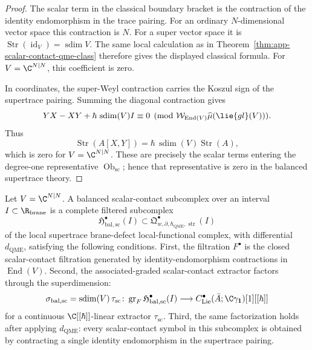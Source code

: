 \begin{proof}
  The scalar term in the classical boundary bracket is the contraction
  of the identity endomorphism in the trace pairing.  For an ordinary
  \(N\)-dimensional vector space this contraction is \(N\).  For a
  super vector space it is
  \(\operatorname{Str}(\operatorname{id}_V)=\operatorname{sdim}V\).
  The same local calculation as in
  Theorem~\ref{thm:app-scalar-contact-qme-class} therefore gives the
  displayed classical formula.  For \(V=\C^{N|N}\), this coefficient is
  zero.

  In coordinates, the super-Weyl contraction carries the Koszul sign of
  the supertrace pairing.  Summing the diagonal contraction gives
  \[
    YX-XY+\hbar\,\operatorname{sdim}(V)I\equiv0
      \pmod{\mathcal W_{\operatorname{End}(V)}
             \widehat\mu(\lie{gl}(V))}.
  \]
  Thus
  \[
    \operatorname{Str}(A[X,Y])
      =\hbar\,\operatorname{sdim}(V)\operatorname{Str}(A),
  \]
  which is zero for \(V=\C^{N|N}\).  These are precisely the scalar
  terms entering the degree-one representative
  \(\operatorname{Ob}_{\mathrm{sc}}\); hence that representative is
  zero in the balanced supertrace theory.
\end{proof}

\begin{defn}
\label{def:app-balanced-scalar-contact-subcomplex}
  Let \(V=\C^{N|N}\).  A balanced scalar-contact subcomplex over an interval
  \(I\subset\R_{\mathrm{brane}}\) is a complete filtered subcomplex
  \[
    \mathfrak H^\bullet_{\mathrm{bal,sc}}(I)
      \subset
    \mathfrak Q^\bullet_{w,\partial,\hbar_{\mathrm{QME}},\operatorname{str}}(I)
  \]
  of the local supertrace brane-defect local-functional complex, with
  differential \(d_{\mathrm{QME}}\), satisfying the following conditions.
  First, the filtration \(F^\bullet\) is the closed scalar-contact
  filtration generated by identity-endomorphism contractions in
  \(\operatorname{End}(V)\).  Second, the associated-graded scalar-contact
  extractor factors through the superdimension:
  \[
    \sigma_{\mathrm{bal,sc}}
      =
    \operatorname{sdim}(V)\,\tau_{\mathrm{sc}}
      \colon
    \operatorname{gr}_{F}\mathfrak H^\bullet_{\mathrm{bal,sc}}(I)
      \longrightarrow
    C^\bullet_{\mathrm{Lie}}(\bar A;\C\gamma_{\mathbf 1})[1][[\hbar]]
  \]
  for a continuous \(\C[[\hbar]]\)-linear extractor
  \(\tau_{\mathrm{sc}}\).  Third, the same factorization holds after
  applying \(d_{\mathrm{QME}}\): every scalar-contact symbol in this
  subcomplex is obtained by contracting a single identity endomorphism in
  the supertrace pairing.
\end{defn}

